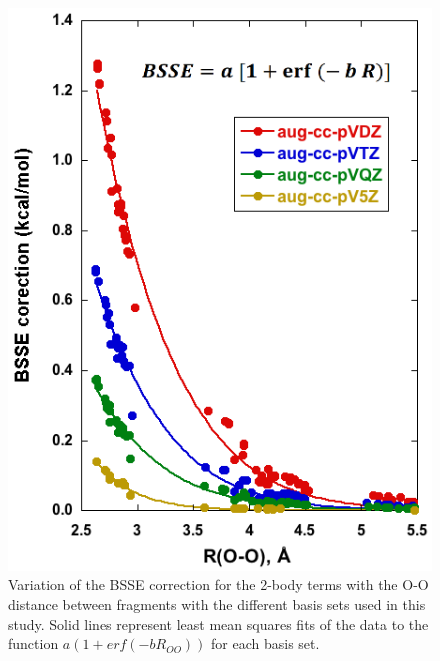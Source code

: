 \begin{figure}[t]
\begin{center}
\includegraphics[width=.5\textwidth]{Figures/Chapter_2/2body_bsse_decay_with_basis.tif}
\end{center}
\begin{spacing}{1.0}
\caption[Variation of the BSSE correction for the 2-body terms with the O-O distance between fragments with the different basis sets used in this study. Solid lines represent least mean squares fits of the data to the function $a(1+erf(-bR_{OO}))$ for each basis set.]{Variation of the BSSE correction for the 2-body terms with the O-O distance between fragments with the different basis sets used in this study. Solid lines represent least mean squares fits of the data to the function $a(1+erf(-bR_{OO}))$ for each basis set.}\label{fig:MBE_I_F9}
\end{spacing}
\end{figure}